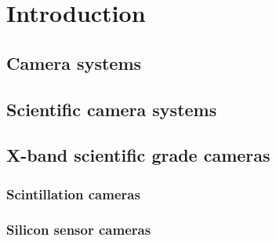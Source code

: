 \chapter{Introduction}

\section{Camera systems}
\section{Scientific camera systems}
\section{X-band scientific grade cameras}
\subsection{Scintillation cameras}
\subsection{Silicon sensor cameras}

